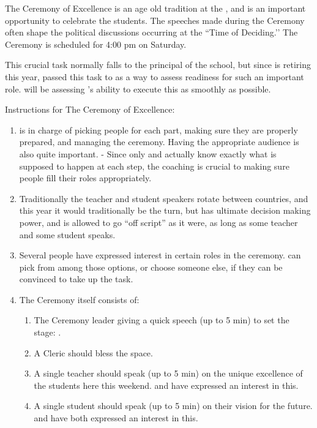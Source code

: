 \documentclass[green]{GL2020}
\begin{document}
\name{\gCeremonyOfExcellence{}}

The Ceremony of Excellence is an age old tradition at the \pSchool{}, and is an important opportunity to celebrate the students. The speeches made during the Ceremony often shape the political discussions occurring at the ``Time of Deciding.’’ The Ceremony is scheduled for 4:00 pm on Saturday.

This crucial task normally falls to the principal of the school, but since \cPrincipal{\full} is retiring this year, \cPrincipal{\they} \cPrincipal{\have} passed this task to \cMusic{\full} as a way to assess \cMusic{\their} readiness for such an important role. \cPrincipal{} will be assessing \cMusic{}’s ability to execute this as smoothly as possible.

Instructions for The Ceremony of Excellence:
\begin{enumerate}
  \item \cMusic{} is in charge of picking people for each part, making sure they are properly prepared, and managing the ceremony. Having the appropriate audience is also quite important. - Since only \cMusic{} and \cPrincipal{} actually know exactly what is supposed to happen at each step, the coaching is crucial to making sure people fill their roles appropriately.
  \item Traditionally the teacher and student speakers rotate between countries, and this year it would traditionally be the \pShippies{} turn, but \cMusic{} has ultimate decision making power, and is allowed to go ``off script'' as it were, as long as some teacher and some student speaks.
  \item Several people have expressed interest in certain roles in the ceremony. \cMusic{} can pick from among those options, or choose someone else, if they can be convinced to take up the task.
  \item The Ceremony itself consists of:
  \begin{enumerate}
    \item The Ceremony leader giving a quick speech (up to 5 min) to set the stage: \cMusic{}.
    \item A Cleric should bless the space.
    \item A single teacher should speak (up to 5 min) on the unique excellence of the students here this weekend. \cFlowPriest{\full} and \cPirate{\full} have expressed an interest in this.
    \item A single student should speak (up to 5 min) on their vision for the future. \cWarlordDaughter{\full} and \cPirateChild{\full} have both expressed an interest in this.

\end{enumerate}
\end{enumerate}
\end{document}

